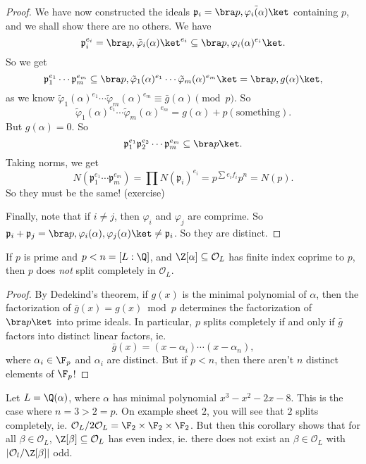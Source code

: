 \documentclass[a4paper]{article}
\begin{document}
\begin{proof}
  We have now constructed the ideals $\mathfrak{p}_i = \bra p, \tilde{\varphi_i(\alpha)}\ket$ containing $p$, and we shall show there are no others. We have
  \[
    \mathfrak{p}_i ^{e_i} = \bra p, \tilde{\varphi}_i(\alpha)\ket^{e_i} \subseteq \bra p, \varphi_i(\alpha)^{e_i}\ket.
  \]
  So we get
  \[
    \mathfrak{p}_1^{e_1} \cdots \mathfrak{p}_m^{e_m} \subseteq \bra p, \tilde{\varphi}_1(\alpha)^{e_1} \cdots \tilde{\varphi}_m(\alpha)^{e_m}\ket = \bra p, g(\alpha)\ket,
  \]
  as we know $\tilde{\varphi}_1(\alpha)^{e_1} \cdots \tilde{\varphi}_m(\alpha)^{e_m} \equiv \bar{g}(\alpha) \pmod p$. So
  \[
    \tilde{\varphi}_1(\alpha)^{e_1} \cdots \tilde{\varphi}_m(\alpha)^{e_m} = g(\alpha) + p(\text{something}).
  \]
  But $g(\alpha) = 0$. So
  \[
    \mathfrak{p}_1^{e_1} \mathfrak{p}_2^{e_2}\cdots \mathfrak{p}_m^{e_m} \subseteq \bra p\ket.
  \]
  Taking norms, we get
  \[
    N(\mathfrak{p}_1^{e_1} \cdots \mathfrak{p}_m^{e_m}) = \prod N(\mathfrak{p}_i)^{e_i} = p^{\sum e_i f_i} p^n = N(p).
  \]
  So they must be the same! (exercise) %

  Finally, note that if $i \not= j$, then $\varphi_i$ and $\varphi_j$ are comprime. So $\mathfrak{p}_i + \mathfrak{p}_j = \bra p, \varphi_i(\alpha), \varphi_j(\alpha)\ket \not= \mathfrak{p}_i$. So they are distinct.
\end{proof}

\begin{cor}
  If $p$ is prime and $p < n = [L:\Q]$, and $\Z[\alpha] \subseteq \mathcal{O}_L$ has finite index coprime to $p$, then $p$ does \emph{not} split completely in $\mathcal{O}_L$.
\end{cor}

\begin{proof}
  By Dedekind's theorem, if $g(x)$ is the minimal polynomial of $\alpha$, then the factorization of $\bar{g}(x) = g(x)\bmod p$ determines the factorization of $\bra p\ket$ into prime ideals. In particular, $p$ splits completely if and only if $\bar{g}$ factors into distinct linear factors, ie.
  \[
    \bar{g}(x) = (x - \alpha_i) \cdots (x- \alpha_n),
  \]
  where $\alpha_i \in \F_p$ and $\alpha_i$ are distinct. But if $p < n$, then there aren't $n$ distinct elements of $\F_p$!
\end{proof}

\begin{eg}
  Let $L = \Q(\alpha)$, where $\alpha$ has minimal polynomial $x^3 - x^2 - 2x - 8$. This is the case where $n = 3 > 2 = p$. On example sheet $2$, you will see that $2$ splits completely, ie. $\mathcal{O}_L/2\mathcal{O}_L = \F_2 \times \F_2 \times \F_2$. But then this corollary shows that for all $\beta \in \mathcal{O}_L$, $\Z[\beta] \subseteq \mathcal{O}_L$ has even index, ie. there does not exist an $\beta \in \mathcal{O}_L$ with $|\mathcal{O}_l/\Z[\beta]|$ odd.
\end{eg}
\end{document}

